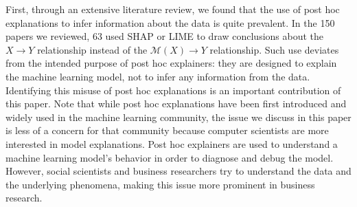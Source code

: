 \documentclass[mnsc,blindrev]{informs3}
\begin{document}
        First, through an extensive literature review, we found that the use of post hoc explanations to infer information about the data is quite prevalent. In the 150 papers we reviewed, 63 used SHAP or LIME to draw conclusions about the $X\rightarrow Y$ relationship instead of the $\mathcal{M}(X)\rightarrow Y$ relationship. Such use deviates from the intended purpose of post hoc explainers: they are designed to explain the machine learning model, not to infer any information from the data. Identifying this misuse of post hoc explanations is an important contribution of this paper. Note that while post hoc explanations have been first introduced and widely used in the machine learning community, the issue we discuss in this paper is less of a concern for that community because computer scientists are more interested in model explanations. Post hoc explainers are used to understand a machine learning model's behavior in order to diagnose and debug the model. However, social scientists and business researchers try to understand the data and the underlying phenomena, making this issue more prominent in business research.

\end{document}
